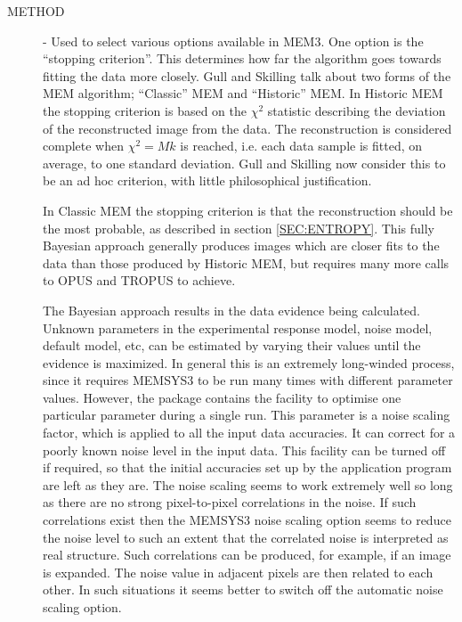 \begin {description} 

\item [METHOD] - Used to select various options available in MEM3. One option
is  the ``stopping criterion''. This determines how far the algorithm goes
towards  fitting the data more closely. Gull and Skilling talk about two forms
of the MEM  algorithm; ``Classic'' MEM and ``Historic'' MEM. In Historic MEM
the stopping  criterion is based on the $\chi^2$ statistic describing the
deviation of the  reconstructed image from the data. The reconstruction is
considered complete  when $\chi^{2}=Mk$ is reached, i.e. each data sample is
fitted, on average, to  one standard deviation. Gull and Skilling now consider
this to be an ad hoc  criterion, with little philosophical justification. 

In Classic MEM the stopping criterion is that the reconstruction should be the 
most probable, as described in section \ref {SEC:ENTROPY}. This  fully 
Bayesian approach generally produces images which are closer fits to the data 
than those produced by Historic MEM, but requires many more calls to OPUS and 
TROPUS to achieve.

The Bayesian approach results in the data evidence being calculated. Unknown 
parameters in the experimental response model, noise model, default model, etc,
can be estimated by varying their values until the evidence is maximized.  In
general this is an extremely long-winded process, since it requires MEMSYS3 to 
be run many times with different parameter values. However, the package
contains  the facility to optimise one particular parameter during a single
run. This  parameter is a noise scaling factor, which is applied to all the
input data  accuracies. It can correct for a poorly known noise level in the
input data. This facility can be turned off if required, so that the initial
accuracies set  up by the application program are left as they are. The noise
scaling seems to  work extremely well so long as there are no strong
pixel-to-pixel  correlations in the noise. If such correlations exist then the
MEMSYS3 noise  scaling option seems to reduce the noise level to such an extent
that the  correlated noise is interpreted as real structure. Such correlations
can be  produced, for example, if an image is expanded. The noise value in
adjacent  pixels are then related to each other. In such situations it seems
better to  switch off the automatic noise scaling option.


\end{description}
